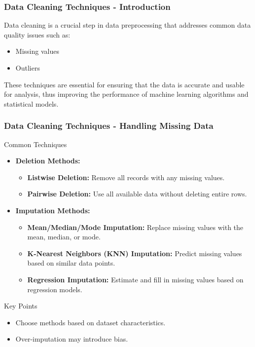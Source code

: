 \documentclass[aspectratio=169]{beamer}
\begin{document}
\begin{frame}[fragile]
    \frametitle{Data Cleaning Techniques - Introduction}
    Data cleaning is a crucial step in data preprocessing that addresses common data quality issues such as:

    \begin{itemize}
        \item Missing values
        \item Outliers
    \end{itemize}

    These techniques are essential for ensuring that the data is accurate and usable for analysis, thus improving the performance of machine learning algorithms and statistical models.
\end{frame}

\begin{frame}[fragile]
    \frametitle{Data Cleaning Techniques - Handling Missing Data}
    \begin{block}{Common Techniques}
        \begin{itemize}
            \item \textbf{Deletion Methods:}
            \begin{itemize}
                \item \textbf{Listwise Deletion:} Remove all records with any missing values.
                \item \textbf{Pairwise Deletion:} Use all available data without deleting entire rows.
            \end{itemize}

            \item \textbf{Imputation Methods:}
            \begin{itemize}
                \item \textbf{Mean/Median/Mode Imputation:} Replace missing values with the mean, median, or mode.
                \item \textbf{K-Nearest Neighbors (KNN) Imputation:} Predict missing values based on similar data points.
                \item \textbf{Regression Imputation:} Estimate and fill in missing values based on regression models.
            \end{itemize}
        \end{itemize}
    \end{block}
    \begin{block}{Key Points}
        \begin{itemize}
            \item Choose methods based on dataset characteristics.
            \item Over-imputation may introduce bias.
        \end{itemize}
    \end{block}
\end{frame}
\end{document}
